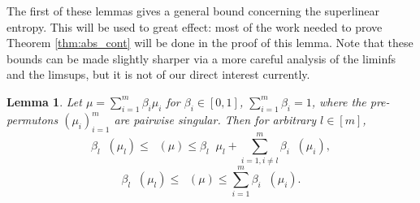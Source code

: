 \documentclass[11pt]{article}
\newcommand{\uppersupent}{\mathop{\overline{H}^{\mathrm{superlin}}}}
\newcommand{\lowersupent}{\mathop{\underline{H}^{\mathrm{superlin}}}}
\newtheorem{lemma}[theorem]{Lemma}
\theoremstyle{definition}
\begin{document}
The first of these lemmas gives a general bound concerning the superlinear entropy. This will be used to great effect: most of the work needed to prove Theorem \ref{thm:abs_cont} will be done in the proof of this lemma. Note that these bounds can be made slightly sharper via a more careful analysis of the liminfs and the limsups, but it is not of our direct interest currently.

\begin{lemma}\label{lemma:entropy_of_convex_comb}
Let $\mu = \sum_{i=1}^m\beta_i\mu_i$ for $\beta_i\in[0, 1]$, $\sum_{i=1}^{m}\beta_i=1$, where the pre-permutons $(\mu_i)_{i=1}^m$ are pairwise singular. Then for arbitrary $l\in [m]$,
$$\beta_l \lowersupent(\mu_l)\leq \lowersupent(\mu)\leq \beta_l\lowersupent{\mu_l} + \sum_{i=1 ,i\neq l}^{m}\beta_i\uppersupent(\mu_i),$$
$$\beta_l \uppersupent(\mu_l)\leq \uppersupent(\mu)\leq \sum_{i=1}^{m}\beta_i\uppersupent(\mu_i).$$ 
\end{lemma}
\end{document}
